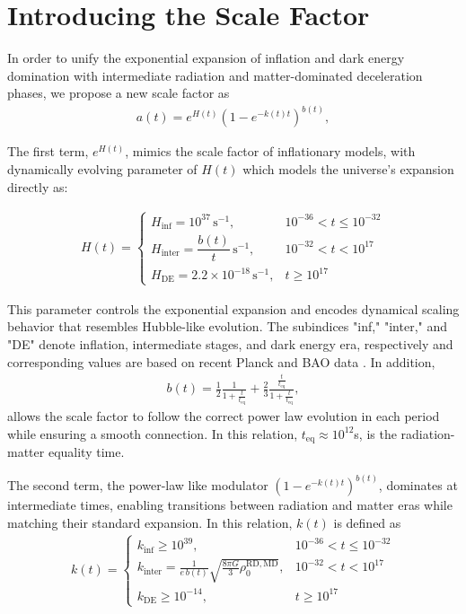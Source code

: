\documentclass[12pt]{article}  %
\def\bea{\begin{eqnarray}}
\def\eea{\end{eqnarray}}
\begin{document}
\section{	Introducing the Scale Factor }



In order to unify the exponential expansion of inflation and dark energy domination with intermediate radiation and matter-dominated deceleration phases, we propose a new scale factor as
\bea
 a(t)=e^{H(t)} { (1-e^{-k(t)t}) }^{b(t)},
\eea

The first term, $e^{H(t)}$, mimics the scale factor of inflationary models, with dynamically evolving parameter of $H(t)$ which models the universe’s expansion directly as:

\bea
	H(t) =
	\begin{cases}
		H_{\mathrm{inf}} =  10^{37} \, \mathrm{s}^{-1}, & 10^{-36} < t \leq 10^{-32} \\[8pt]
		H_{\mathrm{inter}} = \dfrac{b(t)}{t} \, \mathrm{s}^{-1}, & 10^{-32} < t < 10^{17} \\[8pt]
		H_{\mathrm{DE}} = 2.2 \times 10^{-18} \, \mathrm{s}^{-1}, & t \geq 10^{17}
	\end{cases}
\eea

This parameter controls the exponential expansion and encodes dynamical scaling behavior that resembles Hubble-like evolution. The subindices "inf," "inter," and "DE" denote inflation, intermediate stages, and dark energy era, respectively and corresponding values are based on recent Planck and BAO data \cite {34}. In addition, 
\bea
	b(t) = \frac{1}{2} \frac{1}{1 + \frac{t}{t_{\mathrm{eq}}}} + \frac{2}{3} \frac{\frac{t}{t_{\mathrm{eq}}}}{1 + \frac{t}{t_{\mathrm{eq}}}},
\eea
allows the scale factor to follow the correct power law evolution in each period while ensuring a smooth connection. In this relation, $t_{\mathrm{eq}} \approx 10^{12}$s, is the radiation-matter equality time. 


The second term, the power-law like modulator $ { (1-e^{-k(t)t}) }^{b(t)}$, dominates at intermediate times, enabling transitions between radiation and matter eras while matching their standard expansion. In this relation, $k(t)$ is defined as
\bea
	k(t) =
	\begin{cases}
		k_{\mathrm{inf}} \geq 10^{39}, & 10^{-36} < t \leq 10^{-32} \\[8pt]
		k_{\mathrm{inter}} = \frac{1}{e\, b(t)} \sqrt{\frac{8 \pi G}{3} \rho_0^{\mathrm{RD,MD}}}, & 10^{-32} < t < 10^{17} \\[8pt]
		k_{\mathrm{DE}} \geq 10^{-14}, & t \geq 10^{17}
	\end{cases}
\eea
\end{document}
